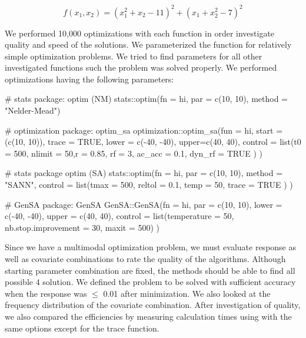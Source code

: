 \begin{equation}
\label{eq:eq1}
f(x_1,x_2)=(x_1^2+x_2-11)^2+(x_1+x_2^2-7)^2
\end{equation}

We performed 10,000 optimizations with each function in order investigate quality and speed of the solutions. We parameterized the  function for relatively simple optimization problems. We tried to find parameters for all other investigated functions such the problem was solved properly. We performed optimizations having the following parameters:

\begin{example}
# stats package: optim (NM)
stats::optim(fn = hi, par = c(10, 10), method = "Nelder-Mead")
	
# optimization package: optim_sa
optimization::optim_sa(fun = hi, start = (c(10, 10)), trace = TRUE, 
	lower = c(-40, -40), upper=c(40, 40),
		control = list(t0 = 500, nlimit = 50,r = 0.85,
		rf = 3, ac_acc = 0.1, dyn_rf = TRUE
		)
	)

# stats package optim (SA)
stats::optim(fn = hi, par = c(10, 10), method = "SANN",
	control = list(tmax = 500, reltol = 0.1, temp = 50, trace = TRUE
		)
	)

# GenSA package: GenSA
GenSA::GenSA(fn = hi, par = c(10, 10), lower = c(-40, -40), upper = c(40, 40), 
	control = list(temperature = 50, nb.stop.improvement = 30, maxit = 500)
	)
\end{example}
Since we have a multimodal optimization problem, we must evaluate response as well as covariate combinations to rate the quality of the algorithms. Although starting parameter combination are fixed, the methods should be able to find all possible 4 solution. We defined the problem to be solved with sufficient accuracy when the response was $\leq$ 0.01 after minimization. We also looked at the frequency distribution of the covariate combination. After investigation of quality, we also compared the efficiencies by measuring calculation times using  with the same options except for the trace function.

